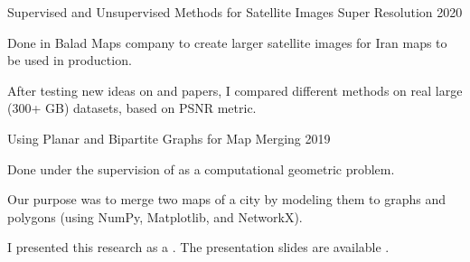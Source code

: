 \begin{cvprojects}
  \cvproject
    {Supervised and Unsupervised Methods for Satellite Images Super Resolution} %
    {} %
    {} %
    {2020} %
    {
      \begin{cvitems} %
        \item {Done in Balad Maps company to create larger satellite images for Iran maps to be used in production.}
        \item {After testing new ideas on  and  papers, I compared different methods on real large (300+ GB) datasets, based on PSNR metric.}
      \end{cvitems}
    }

  \cvproject
    {Using Planar and Bipartite Graphs for Map Merging} %
    {} %
    {} %
    {2019} %
    {
      \begin{cvitems} %
        \item {Done under the supervision of  as a computational geometric problem.}
        \item {Our purpose was to merge two maps of a city by modeling them to graphs and polygons (using NumPy, Matplotlib, and NetworkX).}
        \item {I presented this research as a . The presentation slides are available .}
      \end{cvitems}
    }

\end{cvprojects}